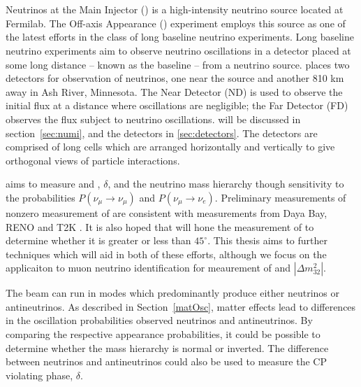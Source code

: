 \chapter{\nova}
\label{nova_chapter}
Neutrinos at the Main Injector (\numi) \cite{abramov2002numi}
is a high-intensity neutrino source located at Fermilab.  The \numi Off-axis \nue Appearance (\nova) experiment employs this source as one of the latest efforts in the class of long baseline neutrino experiments.  Long baseline neutrino experiments aim to observe neutrino oscillations in a detector placed at some long distance -- known as the baseline -- from a neutrino source.  \nova
places two detectors for observation of neutrinos, one near the source and another 810 km away in Ash River, Minnesota.  The Near Detector (ND) is used to observe the initial  \numi flux at a distance where oscillations are negligible; the Far Detector (FD) observes the \numi flux subject to neutrino oscillations.  \numi will be discussed in section~\ref{sec:numi}, and the \nova detectors in \ref{sec:detectors}.  The detectors are comprised of long cells which are arranged horizontally and vertically to give orthogonal views
of particle interactions.

\nova aims to measure and \thetatth, $\delta$, and the neutrino
mass hierarchy though sensitivity to the probabilities $P(\nu_\mu \rightarrow \nu_\mu)$ and $P(\nu_\mu \rightarrow \nu_e)$.  Preliminary measurements of nonzero measurement of \thetaoth are consistent with measurements from Daya Bay, RENO and T2K \cite{nova2016nue}.  It is also hoped that \nova will  hone the measurement of \thetatth to determine whether it is greater or less than $45^\circ$.  This thesis aims to further techniques which will aid in both of these efforts, although we focus on the applicaiton to muon neutrino identification for meaurement of \thetatth and $|\Delta m^2_{32}|$.

The \numi beam can run in modes which predominantly produce either neutrinos
or antineutrinos.
As described in Section~\ref{matOsc}, matter effects lead to differences
in the oscillation probabilities observed neutrinos and antineutrinos.
By comparing the respective appearance probabilities, it could be possible to determine whether the mass hierarchy is normal or inverted.  The difference between neutrinos and antineutrinos could also be used to measure the CP violating phase, $\delta$.

